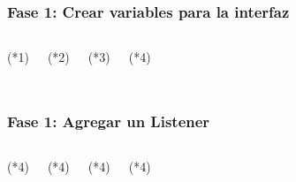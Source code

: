 \begin{frame}[fragile]
\frametitle{Fase 1: Crear variables para la interfaz} 
\begin{columns}
\begin{block}{(*1)}
\inputminted[linenos,fontsize=\tiny]{kotlin}{00_ComportamientoAplicacionTicTacToe/imports_etapa1_fase1.kt}
\end{block}
\begin{block}{(*2)}
\inputminted[linenos,fontsize=\tiny]{kotlin}{00_ComportamientoAplicacionTicTacToe/Variables.kt}
\end{block}
\begin{block}{(*3)}
\inputminted[linenos,fontsize=\tiny]{kotlin}{00_ComportamientoAplicacionTicTacToe/OnCreate.kt}
\end{block}

\begin{block}{(*4)}
\inputminted[linenos,fontsize=\tiny]{kotlin}{00_ComportamientoAplicacionTicTacToe/InicializarBotonesConIds.kt}
\end{block}


\end{columns}
\end{frame}



\begin{frame}[fragile]
\frametitle{Fase 1: Agregar un Listener} 
\begin{columns}
\begin{block}{(*4)}
\inputminted[linenos,fontsize=\tiny]{kotlin}{00_ComportamientoAplicacionTicTacToe/AsignarListenerAFunciones.kt}
\end{block}

\begin{block}{(*4)}
\inputminted[linenos,fontsize=\tiny]{kotlin}{00_ComportamientoAplicacionTicTacToe/listenerVersion0.kt}
\end{block}



\begin{block}{(*4)}
\inputminted[linenos,fontsize=\tiny]{kotlin}{00_ComportamientoAplicacionTicTacToe/CrearMatrizEstatus.kt}
\end{block}

\begin{block}{(*4)}
\inputminted[linenos,fontsize=\tiny]{kotlin}{00_ComportamientoAplicacionTicTacToe/ObtieneFilaColumna.kt}
\end{block}


\end{columns}
\end{frame}

